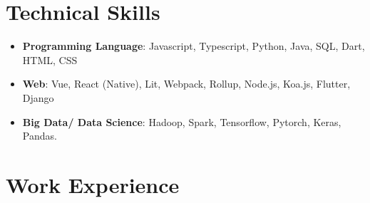 \documentclass[11pt,a4paper,sans]{moderncv}        %
\begin{document}
\makecvtitle
\vspace{-3.25em}
\section{\bfseries{Technical Skills}}

\vspace{2pt}

\begin{itemize}

\item{\textbf{Programming Language}: Javascript, Typescript, Python, Java, SQL, Dart, HTML, CSS }
\vspace{2pt}
\item{\textbf{Web}: Vue, React (Native), Lit, Webpack, Rollup, Node.js, Koa.js, Flutter, Django }
\vspace{2pt}
\item{\textbf{Big Data/ Data Science}: Hadoop, Spark, Tensorflow, Pytorch, Keras, Pandas.}
\end{itemize}

\section{Work Experience}
\end{document}
